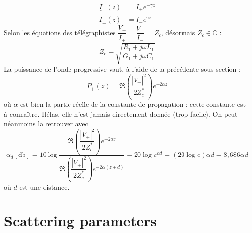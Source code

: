 	\begin{equation}
	\begin{array}{ll}
	\underline{I}_+(z) &= I_+e^{-\gamma z}\\
	\underline{I}_-(z) &= I_-e^{\gamma z}	
	\end{array}
	\end{equation}
	Selon les équations des télégraphistes $\displaystyle \dfrac{V_+}{I_+}=\dfrac{V_-}{I_-}=Z_c$, 
	désormais $Z_c\in\mathbb{C}$ :
	\begin{equation}
	Z_c=\sqrt{\dfrac{R_1+j\omega L_1}{G_1+j\omega C_1}}
	\end{equation}
	La puissance de l'onde progressive vaut, à l'aide de la précédente sous-section :
	\begin{equation}
	P_+(z) = \Re\left(\dfrac{|V_+|^2}{2Z_c^*}\right)e^{-2\alpha z}
	\end{equation}
	où $\alpha$ est bien la partie réelle de la constante de propagation : cette constante 
	est à connaître. Hélas, elle n'est jamais directement donnée (trop facile). On peut 
	néanmoins la retrouver avec
	\begin{equation}
	\alpha_d[\si{\decibel}] = 10\log\dfrac{\Re\left(\dfrac{|V_+|^2}{2Z_c^*}\right)e^{-2\alpha z}}{
	\Re\left(\dfrac{|V_+|^2}{2Z_c^*}\right)e^{-2\alpha (z+d)}} = 20\log e^{\alpha d} = 
	(20\log e)\alpha d = 8,686\alpha d
	\end{equation}
	où $d$ est une distance.
	
	
\section{Scattering parameters}

